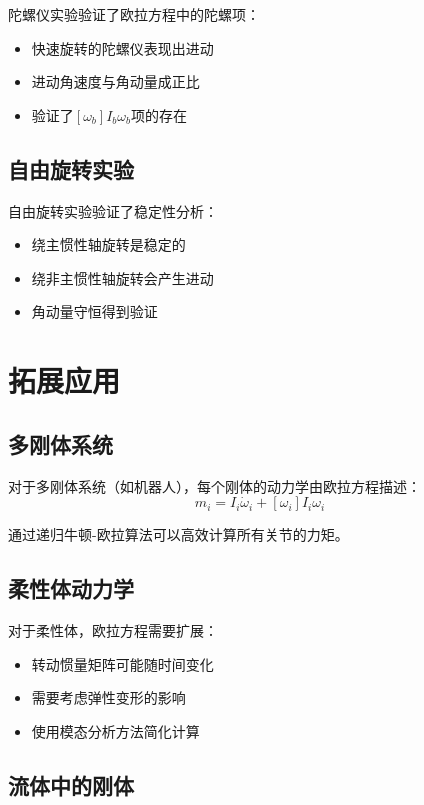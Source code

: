 \documentclass[12pt,a4paper]{article}
\begin{document}
陀螺仪实验验证了欧拉方程中的陀螺项：
\begin{itemize}
\item 快速旋转的陀螺仪表现出进动
\item 进动角速度与角动量成正比
\item 验证了$[\omega_b] I_b \omega_b$项的存在
\end{itemize}

\subsection{自由旋转实验}

自由旋转实验验证了稳定性分析：
\begin{itemize}
\item 绕主惯性轴旋转是稳定的
\item 绕非主惯性轴旋转会产生进动
\item 角动量守恒得到验证
\end{itemize}

\section{拓展应用}

\subsection{多刚体系统}

对于多刚体系统（如机器人），每个刚体的动力学由欧拉方程描述：
\begin{equation}
m_i = I_i \dot{\omega}_i + [\omega_i] I_i \omega_i
\end{equation}

通过递归牛顿-欧拉算法可以高效计算所有关节的力矩。

\subsection{柔性体动力学}

对于柔性体，欧拉方程需要扩展：
\begin{itemize}
\item 转动惯量矩阵可能随时间变化
\item 需要考虑弹性变形的影响
\item 使用模态分析方法简化计算
\end{itemize}

\subsection{流体中的刚体}
\end{document}
